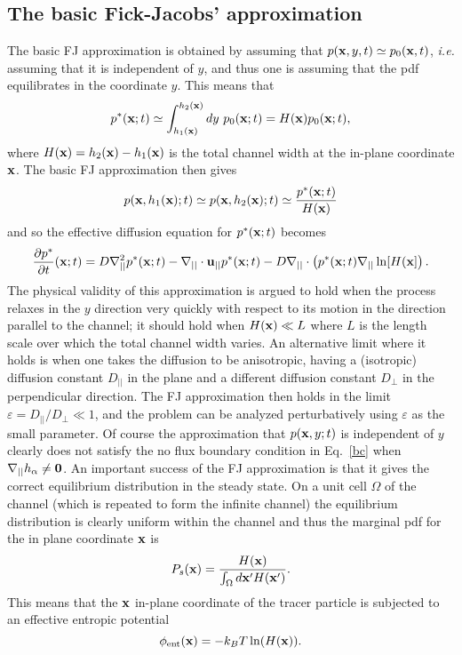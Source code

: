 \documentclass[pre,showpacs,preprintnumbers,amsmath,amssymb,superscriptaddress]{revtex4-1}
\begin{document}
\subsection{The basic Fick-Jacobs' approximation}
The basic FJ approximation is obtained by assuming that $p({\bf x},y,t) \simeq p_0({\bf x},t)$, {\em i.e.} assuming that it is independent of $y$, and thus one is assuming that the pdf equilibrates in the coordinate $y$. This means that
\begin{equation}
p^*({\bf x};t) \simeq \int_{h_1({\bf x})}^{ h_2({\bf x})} dy\ p_0({\bf x};t) = H({\bf x})p_0({\bf x};t) ,
\end{equation}
where $H({\bf x}) = h_2({\bf x}) -h_1({\bf x})$ is the total channel width at the in-plane coordinate ${\bf x}$. The basic FJ approximation then gives
\begin{equation}
p({\bf x},h_1({\bf x});t) \simeq p({\bf x},h_2({\bf x});t) \simeq \frac{p^*({\bf x};t)}{H({\bf x})}
\end{equation}
and so the effective diffusion equation for $p^*({\bf x};t)$ becomes
\begin{equation}
\frac{\partial p^*}{\partial t}({\bf x};t) = D\nabla_{||}^2 p^*({\bf x};t) - \nabla_{||}\cdot {\bf u}_{||}
p^*({\bf x};t) - D\nabla_{||}\cdot \left(p^*({\bf x};t) \nabla_{||} \ln[H({\bf x}]\right).\label{fj0}
\end{equation}
The physical validity of this approximation is argued to hold when the process relaxes in the 
$y$ direction very quickly with respect to its motion in the direction parallel to the channel; it
should hold when $H({\bf x}) \ll L$ where $L$ is the length scale over which the total channel
width varies. An alternative limit where it holds is when one takes the diffusion to be anisotropic, having a (isotropic) diffusion constant $D_{||}$ in the plane and a different diffusion constant $D_\perp$ in the perpendicular direction. The FJ approximation then holds in the limit $\varepsilon =D_{||}/D_\perp\ll 1$, and the problem can be analyzed perturbatively using $\varepsilon$ as the small parameter. Of course the approximation that $p({\bf x},y;t)$ is independent of $y$ clearly does not satisfy the no flux boundary condition in Eq.~\eqref{bc} when $\nabla_{||}h_\alpha\neq {\bf 0}$. An important success of the FJ approximation is that it gives the correct equilibrium distribution in the steady state. On a unit cell $\Omega$ of the channel (which is repeated to form the infinite channel) the equilibrium distribution is clearly uniform within the channel and thus the marginal pdf for the in plane coordinate ${\bf x}$ is 
\begin{equation}
P_s({\bf x}) = \frac{H({\bf x})}{\int_\Omega d{\bf x'} H({\bf x'})}.\label{ssp}
\end{equation}
This means that the ${\bf x}$ in-plane coordinate of the tracer particle is subjected to an effective entropic potential
\begin{equation}
\phi_{\rm ent}({\bf x}) = -k_BT\ln(H({\bf x})).
\end{equation}
\end{document}
